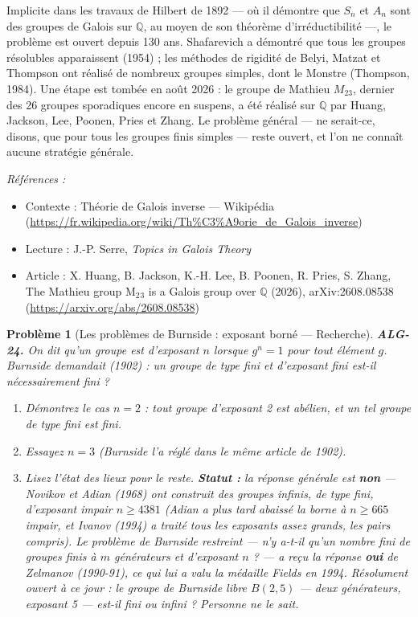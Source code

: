 \documentclass[11pt]{article}
\newtheorem{problem}{Problème}
\newenvironment{refs}{\par\small\noindent\emph{Références :}\begin{itemize}\setlength\itemsep{0pt}}{\end{itemize}\normalsize}
\begin{document}
\noindent Implicite dans les travaux de Hilbert de 1892 --- où il démontre que $S_n$ et $A_n$ sont
des groupes de Galois sur $\mathbb{Q}$, au moyen de son théorème d'irréductibilité ---, le problème est
ouvert depuis 130 ans. Shafarevich a démontré que tous les groupes résolubles apparaissent (1954) ; les
méthodes de rigidité de Belyi, Matzat et Thompson ont réalisé de nombreux groupes simples, dont le Monstre
(Thompson, 1984). Une étape est tombée en août 2026 : le groupe de Mathieu $M_{23}$, dernier des 26 groupes
sporadiques encore en suspens, a été réalisé sur $\mathbb{Q}$ par Huang, Jackson, Lee, Poonen, Pries et
Zhang. Le problème général --- ne serait-ce, disons, que pour tous les groupes finis simples --- reste ouvert, et
l'on ne connaît aucune stratégie générale.

\begin{refs}
\item Contexte : Théorie de Galois inverse --- Wikipédia (\url{https://fr.wikipedia.org/wiki/Th%C3%A9orie_de_Galois_inverse})
\item Lecture : J.-P. Serre, \textit{Topics in Galois Theory}
\item Article : X. Huang, B. Jackson, K.-H. Lee, B. Poonen, R. Pries, S. Zhang, \og{} The Mathieu group M$_2$$_3$ is a Galois group over $\mathbb{Q}$ \fg{} (2026), arXiv:2608.08538 (\url{https://arxiv.org/abs/2608.08538})
\end{refs}

\bigskip

\begin{problem}[{Les problèmes de Burnside : exposant borné --- Recherche}]
\textbf{ALG-24.} On dit qu'un groupe est d'\textit{exposant} $n$ lorsque $g^n = 1$ pour
tout élément $g$. Burnside demandait (1902) : un groupe de type fini et d'exposant fini est-il
nécessairement fini ?
\begin{enumerate}
\item[(i)] Démontrez le cas $n = 2$ : tout groupe d'exposant 2 est abélien, et un tel groupe de type
fini est fini.
\item[(ii)] Essayez $n = 3$ (Burnside l'a réglé dans le même article de 1902).
\item[(iii)] Lisez l'état des lieux pour le reste. \textbf{Statut :} la réponse générale est \textbf{non} --- Novikov et
Adian (1968) ont construit des groupes infinis, de type fini, d'exposant impair $n \ge 4381$
(Adian a plus tard abaissé la borne à $n \ge 665$ impair, et Ivanov (1994) a traité tous les
exposants assez grands, les pairs compris). Le problème de Burnside \textit{restreint} --- n'y
a-t-il qu'un nombre fini de groupes \textit{finis} à $m$ générateurs et d'exposant $n$ ? --- a reçu la
réponse \textbf{oui} de Zelmanov (1990-91), ce qui lui a valu la médaille Fields en 1994. Résolument ouvert
à ce jour : le groupe de Burnside libre $B(2,5)$ --- deux générateurs, exposant 5 --- est-il fini ou infini ?
Personne ne le sait.
\end{enumerate}

\end{problem}
\end{document}
